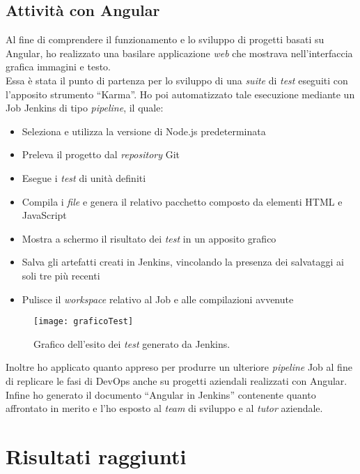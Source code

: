 \subsection{Attività con Angular}
Al fine di comprendere il funzionamento e lo sviluppo di progetti basati su Angular, ho realizzato una basilare applicazione \emph{web} che mostrava nell'interfaccia grafica immagini e testo.\\
Essa è stata il punto di partenza per lo sviluppo di una \emph{suite} di \emph{test} eseguiti con l'apposito strumento “Karma”. Ho poi automatizzato tale esecuzione mediante un Job Jenkins di tipo \emph{pipeline}, il quale: 
\begin{itemize}
    \item Seleziona e utilizza la versione di Node.js predeterminata
    \item Preleva il progetto dal \emph{repository} Git
    \item Esegue i \emph{test} di unità definiti
    \item Compila i \emph{file} e genera il relativo pacchetto composto da elementi HTML e JavaScript
    \item Mostra a schermo il risultato dei \emph{test} in un apposito grafico
    \item Salva gli artefatti creati in Jenkins, vincolando la presenza dei salvataggi ai soli tre più recenti
    \item Pulisce il \emph{workspace} relativo al Job e alle compilazioni avvenute  
\end{itemize}
\begin{figure}[htbp] 
    \centering 
    \texttt{[image: graficoTest]} 
    \caption{Grafico dell'esito dei \emph{test} generato da Jenkins.}
    \label{fig:graficoTest}
\end{figure}
Inoltre ho applicato quanto appreso per produrre un ulteriore \emph{pipeline} Job al fine di replicare le fasi di \gls{DevOps} anche su progetti aziendali realizzati con Angular.\\
Infine ho generato il documento “Angular in Jenkins” contenente quanto affrontato in merito e l'ho esposto al \emph{team} di sviluppo e al \emph{\emph{tutor}} aziendale. 

\section{Risultati raggiunti}
